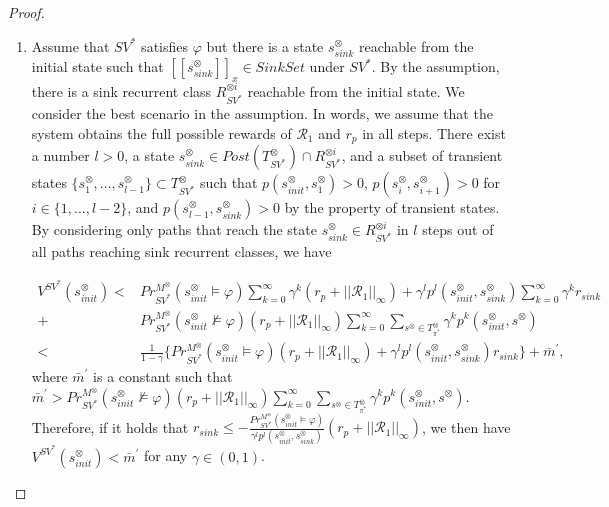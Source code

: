 \documentclass[10pt]{article}
\theoremstyle{definition}
\newcommand{\myspqsink}{\ensuremath{[\![s^{\otimes}_{sink}]\!]}_x}
\begin{document}
\begin{proof}
\begin{enumerate}
  \item Assume that $SV^{\ast}$ satisfies $\varphi$ but there is a state $s^{\otimes}_{sink}$ reachable from the initial state such that $\myspqsink \in SinkSet$ under $SV^{\ast}$. By the assumption, there is a sink recurrent class $R^{\otimes i}_{SV^{\ast}}$ reachable from the initial state. We consider the best scenario in the assumption. In words, we assume that the system obtains the full possible rewards of $\mathcal{R}_1$ and $r_p$ in all steps. There exist a number $l > 0$, a state $s^{\otimes}_{sink} \in Post(T^{\otimes}_{SV^{\ast}}) \cap R^{\otimes i}_{SV^{\ast}}$, and a subset of transient states $\{ s^{\otimes}_1, \ldots , s^{\otimes}_{l-1} \} \subset T^{\otimes}_{SV^{\ast}}$ such that $p(s^{\otimes}_{init}, s^{\otimes}_1)>0$, $p(s^{\otimes}_{i}, s^{\otimes}_{i+1})>0$ for $i \in \{ 1,...,l-2 \}$, and $p(s^{\otimes}_{l-1}, s^{\otimes}_{sink})>0$ by the property of transient states. By considering only paths that reach the state $s^{\otimes}_{sink} \in R^{\otimes i}_{SV^{\ast}}$ in $l$ steps out of all paths reaching sink recurrent classes, we have

  \begin{align}
    V^{SV^{\ast}}(s^{\otimes}_{init}) < & Pr^{M^{\otimes}}_{SV^{\ast}}(s^{\otimes}_{init} \models \varphi) \sum_{k=0}^{\infty} \gamma^k (r_p + ||\mathcal{R}_1||_{\infty}) + \gamma^l p^l(s^{\otimes}_{init}, s^{\otimes}_{sink}) \sum_{k=0}^{\infty} \gamma^k r_{sink} \nonumber \\
    + & Pr^{M^{\otimes}}_{SV^{\ast}}(s^{\otimes}_{init} \not\models \varphi) (r_p + ||\mathcal{R}_1||_{\infty}) \sum_{k=0}^{\infty} \sum_{s^{\otimes} \in T^{\otimes}_{\pi^{\ast}}} \gamma^k p^k(s^{\otimes}_{init}, s^{\otimes}) \nonumber \\
    < & \frac{1}{1-\gamma} \{ Pr^{M^{\otimes}}_{SV^{\ast}}(s^{\otimes}_{init} \models \varphi) (r_p + ||\mathcal{R}_1||_{\infty}) + \gamma^l p^l (s^{\otimes}_{init}, s^{\otimes}_{sink}) r_{sink} \} + \bar{m}^{\prime}, \nonumber
  \end{align}
  where $\bar{m}^{\prime}$ is a constant such that $\bar{m}^{\prime} > Pr^{M^{\otimes}}_{SV^{\ast}}(s^{\otimes}_{init} \not\models \varphi) (r_p + ||\mathcal{R}_1||_{\infty}) \sum_{k=0}^{\infty} \sum_{s^{\otimes} \in T^{\otimes}_{\pi^{\ast}}} \gamma^k p^k(s^{\otimes}_{init}, s^{\otimes})$.
  Therefore, if it holds that $r_{sink} \leq - \frac{Pr^{M^{\otimes}}_{SV^{\ast}}(s^{\otimes}_{init} \models \varphi)}{ \gamma^l p^l (s^{\otimes}_{init}, s^{\otimes}_{sink})} (r_p + ||\mathcal{R}_1||_{\infty})$, we then have $V^{SV^{\ast}}(s^{\otimes}_{init}) < \bar{m}^{\prime}$ for any $\gamma \in (0,1)$.


\end{enumerate}
\end{proof}
\end{document}
